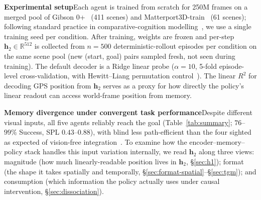 \documentclass{article}
\begin{document}
\noindent\textbf{Experimental setup}\quad Each agent is trained from scratch for 250M frames on a merged pool of Gibson 0+~\citep{xia2018gibson} (411 scenes) and Matterport3D-train~\citep{chang2017matterport3d} (61 scenes); following standard practice in comparative-cognition modelling~\citep{wijmans2023emergence,banino2018grid,cueva2018grid,schaeffer2023grid}, we use a single training seed per condition. After training, weights are frozen and per-step $\mathbf{h}_2 \in \mathbb{R}^{512}$ is collected from $n{=}500$ deterministic-rollout episodes per condition on the same scene pool (new (start, goal) pairs sampled fresh, not seen during training). The default decoder is a Ridge linear probe ($\alpha{=}10$, 5-fold episode-level cross-validation, with Hewitt--Liang permutation control~\citep{hewitt2019control}). The linear $R^2$ for decoding GPS position from $\mathbf{h}_2$ serves as a proxy for how directly the policy's linear readout can access world-frame position from memory.


\noindent\textbf{Memory divergence under convergent task performance}\quad Despite different visual inputs, all five agents reliably reach the goal (Table~\ref{tab:summary}; $76$--$99\%$ Success, SPL $0.43$--$0.88$), with blind less path-efficient than the four sighted as expected of vision-free integration~\citep{wijmans2023emergence}. To examine how the encoder--memory--policy stack handles this input variation internally, we read $\mathbf{h}_2$ along three views: magnitude (how much linearly-readable position lives in $\mathbf{h}_2$, §\ref{sec:h1}); format (the shape it takes spatially and temporally, §\ref{sec:format-spatial}--§\ref{sec:tgm}); and consumption (which information the policy actually uses under causal intervention, §\ref{sec:dissociation}).
\end{document}

